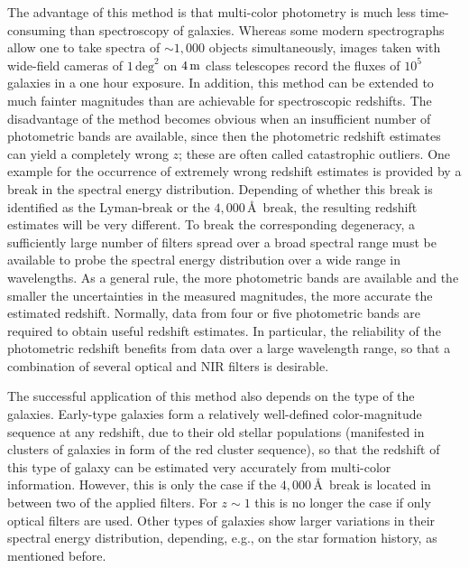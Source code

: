 \documentclass[a4paper,10pt]{article}
\begin{document}
{\noindent}The advantage of this method is that multi-color photometry is much less time-consuming than spectroscopy of galaxies. Whereas some modern spectrographs allow one to take spectra of $\sim1,000$ objects simultaneously, images taken with wide-field cameras of $1\,\mathrm{deg}^2$ on $4\,{\rm m}$ class telescopes record the fluxes of $10^5$ galaxies in a one hour exposure. In addition, this method can be extended to much fainter magnitudes than are achievable for spectroscopic redshifts. The disadvantage of the method becomes obvious when an insufficient number of photometric bands are available, since then the photometric redshift estimates can yield a completely wrong $z$; these are often called catastrophic outliers. One example for the occurrence of extremely wrong redshift estimates is provided by a break in the spectral energy distribution. Depending of whether this break is identified as the Lyman-break or the $4,000$\,\AA~break, the resulting redshift estimates will be very different. To break the corresponding degeneracy, a sufficiently large number of filters spread over a broad spectral range must be available to probe the spectral energy distribution over a wide range in wavelengths. As a general rule, the more photometric bands are available and the smaller the uncertainties in the measured magnitudes, the more accurate the estimated redshift. Normally, data from four or five photometric bands are required to obtain useful redshift estimates. In particular, the reliability of the photometric redshift benefits from data over a large wavelength range, so that a combination of several optical and NIR filters is desirable.

{\noindent}The successful application of this method also depends on the type of the galaxies. Early-type galaxies form a relatively well-defined color-magnitude sequence at any redshift, due to their old stellar populations (manifested in clusters of galaxies in form of the red cluster sequence), so that the redshift of this type of galaxy can be estimated very accurately from multi-color information. However, this is only the case if the $4,000$\,\AA~break is located in between two of the applied filters. For $z\sim1$ this is no longer the case if only optical filters are used. Other types of galaxies show larger variations in their spectral energy distribution, depending, e.g., on the star formation history, as mentioned before.
\end{document}
